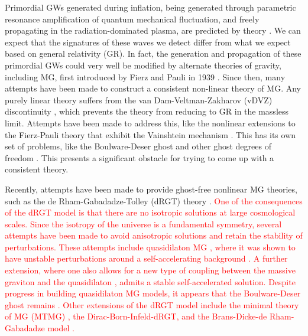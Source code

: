 \documentclass[prd,twocolumn,aps,psfig,nofootinbib,nobibnotes,superscriptaddress,preprintnumbers,times]{revtex4-2}
\def\red{\textcolor{red}}
\begin{document}
Primordial GWs generated during inflation, being generated through parametric resonance amplification of quantum mechanical fluctuation, and freely propagating in the radiation-dominated plasma, are predicted by theory 
\cite{Grishchuk:1976,Grishchuk:1977zz,Starobinsky:1980te,Linde:1981mu,Fabbri:1983us}. We can expect that the signatures of these waves we detect differ from what we expect based on general relativity (GR). In fact, the generation and propagation of these primordial GWs could very well be modified by alternate theories of gravity, including MG, first introduced by Fierz and Pauli in 1939 \cite{Fierz:1939ix}. Since then, many attempts have been made to construct a consistent non-linear theory of MG. Any purely linear theory suffers from the van Dam-Veltman-Zakharov (vDVZ) discontinuity \cite{vanDam:1970vg,Zakharov:1970cc}, which prevents the theory from reducing to GR in the massless limit. Attempts have been made to address this, like the nonlinear extensions to the Fierz-Pauli theory that exhibit the Vainshtein mechanism \cite{Vainshtein:1972sx}. This has its own set of problems, like the Boulware-Deser ghost and other ghost degrees of freedom \cite{Boulware:1972yco,Dubovsky:2004sg}. This presents a significant obstacle for trying to come up with a consistent theory.

Recently, attempts have been made to provide ghost-free nonlinear MG  theories, such as the de Rham-Gabadadze-Tolley (dRGT) theory \cite{Hassan:2011tf, Hassan:2011ea, deRham:2010ik,deRham:2010kj}. \red{One of the consequences of the dRGT model is that there are no isotropic solutions at large cosmological scales. Since the isotropy of the universe is a fundamental symmetry, several attempts have been made to avoid anisotropic solutions and retain the stability of perturbations. These attempts include quasidilaton MG \cite{DAmico:2012hia}, where it was shown to have unstable perturbations around a self-accelerating background \cite{Gumrukcuoglu:2013nza}. A further extension, where one also allows for a new type of coupling between the massive graviton and the quasidilaton \cite{DeFelice:2013tsa}, admits a stable self-accelerated solution. Despite progress in building quasidilaton MG models, it appears that the Boulware-Deser ghost remains \cite{Mukohyama:2013raa}. Other extensions of the dRGT model include the minimal theory of MG (MTMG) \cite{DeFelice:2015hla,DeFelice:2015moy}, the Dirac-Born-Infeld-dRGT\cite{Kazempour:2022giy}, and the Brans-Dicke-de Rham-Gabadadze model \cite{Kazempour:2022let}.}
\end{document}
